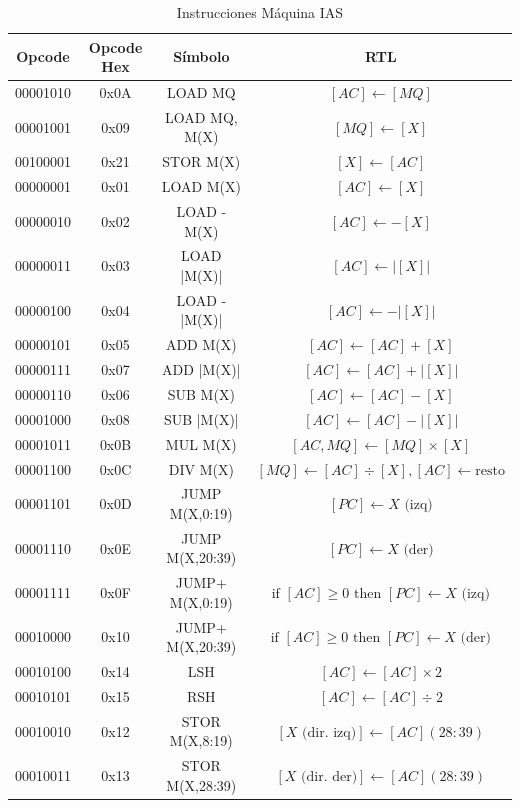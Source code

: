 \documentclass{article}
\begin{document}
\begin{table}[htbp]
  \caption{Instrucciones Máquina IAS}
  \label{tab:tablaISA-IAS}
  \centering
  \begin{tabular}{|cccc|}
    \hline
    Opcode   & Opcode Hex &  Símbolo          & RTL \\ \hline
    00001010 & 0x0A       &  LOAD MQ          & $[AC]\leftarrow[MQ]$\\
    00001001 & 0x09       &  LOAD MQ, M(X)    & $[MQ]\leftarrow[X]$\\
    00100001 & 0x21       &  STOR M(X)        & $[X]\leftarrow[AC]$\\
    00000001 & 0x01       &  LOAD M(X)        & $[AC]\leftarrow[X]$\\
    00000010 & 0x02       &  LOAD -M(X)       & $[AC]\leftarrow -[X]$\\
    00000011 & 0x03       &  LOAD |M(X)|      & $[AC]\leftarrow|[X]|$\\
    00000100 & 0x04       &  LOAD -|M(X)|     & $[AC]\leftarrow-|[X]|$\\
    00000101 & 0x05       &  ADD M(X)         & $[AC]\leftarrow[AC]+[X]$\\
    00000111 & 0x07       &  ADD |M(X)|       & $[AC]\leftarrow[AC]+|[X]|$\\
    00000110 & 0x06       &  SUB M(X)         & $[AC]\leftarrow[AC]-[X]$\\
    00001000 & 0x08       &  SUB |M(X)|       & $[AC]\leftarrow[AC]-|[X]|$\\
    00001011 & 0x0B       &  MUL M(X)         & $[AC, MQ]\leftarrow[MQ]\times[X]$\\
    00001100 & 0x0C       &  DIV M(X)         & $[MQ]\leftarrow[AC]\div[X], [AC]\leftarrow\text{resto}$\\
    00001101 & 0x0D       &  JUMP M(X,0:19)   & $[PC]\leftarrow X\text{ (izq)}$\\
    00001110 & 0x0E       &  JUMP M(X,20:39)  & $[PC]\leftarrow X\text{ (der)}$\\
    00001111 & 0x0F       &  JUMP+ M(X,0:19)  & $\text{if } [AC] \ge 0 \text{ then } [PC]\leftarrow X\text{ (izq)}$\\
    00010000 & 0x10       &  JUMP+ M(X,20:39) & $\text{if } [AC] \ge 0 \text{ then } [PC]\leftarrow X\text{ (der)}$\\
    00010100 & 0x14       &  LSH              & $[AC]\leftarrow[AC]\times 2$\\
    00010101 & 0x15       &  RSH              & $[AC]\leftarrow[AC]\div 2$\\
    00010010 & 0x12       &  STOR M(X,8:19)   & $[X\text{ (dir. izq)}]\leftarrow[AC](28:39)$\\
    00010011 & 0x13       &  STOR M(X,28:39)  & $[X\text{ (dir. der)}]\leftarrow[AC](28:39)$\\
    \hline
  \end{tabular}
\end{table}
\end{document}
